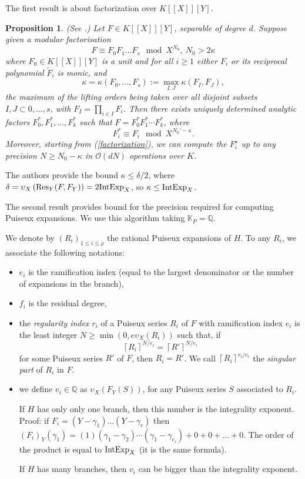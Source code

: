 \documentclass[a4paper,11pt,reqno]{amsart}%
\theoremstyle{definition}
\theoremstyle{plain}
\newtheorem{proposition}[defn]{Proposition}
\theoremstyle{remark}
\newcommand{\Q}{{\mathbb Q}}
\newcommand{\bigO}{\mathcal{O}}
\newcommand\ct[1]{\text{\rmfamily\upshape #1}}
\newcommand{\IntExpX}{\ct{IntExp}_X}
\begin{document}
The first result is about factorization over $K[[X]][Y]$.

\begin{proposition}\label{prop:factors}(See \cite[Proposition 23]{poteaux2021}.)
Let $F \in K[[X]][Y]$, separable of degree $d$. Suppose given a modular factorisation
\begin{equation}\label{factorization}
F \equiv  F_0 F_1 \dots F_s \mod X^{N_0}, \ N_0 > 2\kappa
\end{equation}
where $F_0 \in K[[X]][Y]$ is a unit and for all $i \ge 1$ either $F_i$ or its reciprocal polynomial $\tilde F_i$ is monic, and
$$
\kappa = \kappa(F_0,..., F_s) := \max_{I, J} \kappa(F_I, F_J),
$$
the maximum of the lifting orders being taken over all disjoint subsets $I, J \subset {0,\dots,s}$,
with $F_I = \prod_{i\in I} F_i$. Then there exists uniquely determined analytic factors $F_0^*, F_1^*,\dots, F_k^*$ such that $F = F_0^* F_1^* \cdots F_k^*$, where
$$
F_i^* \equiv F_i \mod X^{N_0'-\kappa}.
$$
Moreover, starting from (\ref{factorization}), we can compute the $F_i^\star$ up to any precision $N \ge N_0 - \kappa$ in $\bigO(dN)$ operations over $K$.
\end{proposition}

The authors provide the bound $\kappa \le \delta / 2$, where $\delta = \upsilon_X \left( \operatorname{Res}_Y(F, F_Y) \right) = 2 \IntExpX$, so $\kappa \le \IntExpX$.

The second result provides bound for the precision required for computing Puiseux expansions.
We use this algorithm taking $\mathbb{K}_P = \Q$.

We denote by \( (R_i)_{1 \le i \le \rho} \) the rational Puiseux expansions of \( H \). To any \( R_i \), we associate the following notations:
\begin{itemize}
    \item $e_i$ is the ramification index (equal to the largest denominator or the number of expansions in the branch),
    \item $f_i$ is the residual degree,
    \item the \emph{regularity index} \( r_i \) of a Puiseux series \( R_i \) of \( F \) with ramification index \( e_i \) is the least integer \( N \ge \min(0, e \upsilon_X(R_i)) \) such that, if
\[
\left\lceil R_i \right\rceil^{N/e_i} = \left\lceil R' \right\rceil^{N/e_i}
\]
for some Puiseux series \( R' \) of \( F \), then \( R_i = R' \). We call \( \left\lceil R_i \right\rceil^{r_i/e_i} \) the \emph{singular part} of \( R_i \) in \( F \).
    \item we define \( v_i \in \mathbb{Q} \) as \( \upsilon_X(F_Y(S)) \), for any Puiseux series \( S \) associated to \( R_i \).

    If $H$ has only only one branch, then this number is the integrality exponent. Proof: if $F_i = (Y-\gamma_1) \dots (Y-\gamma_r)$ then $(F_i)_Y(\gamma_1) = (1)(\gamma_1 - \gamma_2)\cdots (\gamma_1 - \gamma_{e_i}) + 0 + 0 + \dots + 0$. The order of the product is equal to $\IntExpX$ (it is the same formula).

    If $H$ has many branches, then $v_i$ can be bigger than the integrality exponent.
\end{itemize}
\end{document}
